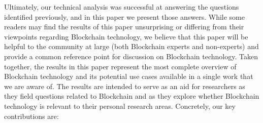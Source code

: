 

Ultimately, our technical analysis was successful at answering the questions 
identified previously, and in this paper we present those answers.
While some readers may find the results of this paper unsurprising or differing from their viewpoints regarding Blockchain technology, we believe that this paper will be helpful to the community at large (both Blockchain experts and non-experts) and provide a common reference point for discussion on Blockchain technology.
Taken together, the results in this paper represent the most complete overview of Blockchain technology and its potential use cases available in a single work that we are aware of.
The results are intended to serve as an aid for researchers as they field questions related to Blockchain and as they explore whether Blockchain technology is relevant to their personal research areas.
Concretely, our key contributions are:

